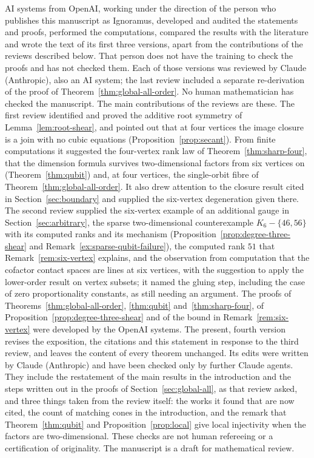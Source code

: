 \documentclass[11pt]{article}
\theoremstyle{remark}\newtheorem{remark}[theorem]{Remark}
\begin{document}
AI systems from OpenAI, working under the direction of the person who publishes this manuscript as Ignoramus, developed and audited the statements and proofs, performed the computations, compared the results with the literature and wrote the text of its first three versions, apart from the contributions of the reviews described below. That person does not have the training to check the proofs and has not checked them. Each of those versions was reviewed by Claude (Anthropic), also an AI system; the last review included a separate re-derivation of the proof of Theorem~\ref{thm:global-all-order}. No human mathematician has checked the manuscript. The main contributions of the reviews are these. The first review identified and proved the additive root symmetry of Lemma~\ref{lem:root-shear}, and pointed out that at four vertices the image closure is a join with no cubic equations (Proposition~\ref{prop:secant}). From finite computations it suggested the four-vertex rank law of Theorem~\ref{thm:sharp-four}, that the dimension formula survives two-dimensional factors from six vertices on (Theorem~\ref{thm:qubit}) and, at four vertices, the single-orbit fibre of Theorem~\ref{thm:global-all-order}. It also drew attention to the closure result cited in Section~\ref{sec:boundary} and supplied the six-vertex degeneration given there. The second review supplied the six-vertex example of an additional gauge in Section~\ref{sec:arbitrary}, the sparse two-dimensional counterexample $K_6-\{46,56\}$ with its computed ranks and its mechanism (Proposition~\ref{prop:degree-three-shear} and Remark~\ref{ex:sparse-qubit-failure}), the computed rank $51$ that Remark~\ref{rem:six-vertex} explains, and the observation from computation that the cofactor contact spaces are lines at six vertices, with the suggestion to apply the lower-order result on vertex subsets; it named the gluing step, including the case of zero proportionality constants, as still needing an argument. The proofs of Theorems~\ref{thm:global-all-order}, \ref{thm:qubit} and~\ref{thm:sharp-four}, of Proposition~\ref{prop:degree-three-shear} and of the bound in Remark~\ref{rem:six-vertex} were developed by the OpenAI systems. The present, fourth version revises the exposition, the citations and this statement in response to the third review, and leaves the content of every theorem unchanged. Its edits were written by Claude (Anthropic) and have been checked only by further Claude agents. They include the restatement of the main results in the introduction and the steps written out in the proofs of Section~\ref{sec:global-all}, as that review asked, and three things taken from the review itself: the works it found that are now cited, the count of matching cones in the introduction, and the remark that Theorem~\ref{thm:qubit} and Proposition~\ref{prop:local} give local injectivity when the factors are two-dimensional. These checks are not human refereeing or a certification of originality. The manuscript is a draft for mathematical review.
\end{document}
